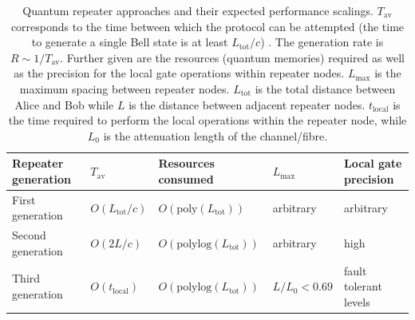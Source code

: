 \documentclass[twocolumn, aps, rmp, amsmath, amssymb, nofootinbib, superscriptaddress, longbibliography, floatfix, table-of-contents, eqsecnum]{revtex4-1}
\begin{document}
\begin{widetext}
\begin{center}
\begin{table}[!htb]
\centering
\begin{tabular}{ccccc}
\hline
\multicolumn{1}{|l|}{\textbf{Repeater generation}} & \multicolumn{1}{l|}{\rm $T_\mathrm{av}$}   & \multicolumn{1}{l|}{\rm Resources consumed}    & \multicolumn{1}{l|}{\rm  $L_\mathrm{max}$}     & \multicolumn{1}{l|}{\rm  Local gate precision}     \\ \hline \hline
\multicolumn{1}{|l|}{First generation}    & \multicolumn{1}{l|}{$O(L_\mathrm{tot}/c)$} & \multicolumn{1}{l|}{$O(\mathrm{poly}(L_\mathrm{tot}))$} & \multicolumn{1}{l|}{\rm arbitrary}  & \multicolumn{1}{l|}{\rm arbitrary}    \\ \hline
\multicolumn{1}{|l|}{Second generation}   & \multicolumn{1}{l|}{$O(2 L/c)$}     & \multicolumn{1}{l|}{$O(\mathrm{polylog}(L_\mathrm{tot}))$} & \multicolumn{1}{l|}{\rm arbitrary}  & \multicolumn{1}{l|}{\rm high}   \\ \hline
\multicolumn{1}{|l|}{Third generation}   & \multicolumn{1}{l|}{$O(t_\mathrm{local})$}     & \multicolumn{1}{l|}{$O(\mathrm{polylog}(L_\mathrm{tot}))$} & \multicolumn{1}{l|}{$L/L_0<0.69$}   & \multicolumn{1}{l|}{\rm fault tolerant levels}   \\
\hline
\end{tabular}
\caption{Quantum repeater approaches and their expected performance scalings.  $T_\mathrm{av}$ corresponds to the time between which the protocol can be attempted (the time to generate a single Bell state is at least $L_\mathrm{tot}/c$) \cite{bib:Muralidharan2016}. The generation rate is $R\sim 1/T_\mathrm{av}$. Further given are the resources (quantum memories) required as well as the precision for the local gate operations within repeater nodes. $L_\mathrm{max}$ is the maximum spacing between repeater nodes. $L_\mathrm{tot}$ is the total distance between Alice and Bob while $L$ is the distance between adjacent repeater nodes. $t_\mathrm{local}$ is the time required to perform the local operations within the repeater node, while $L_0$ is the attenuation length of the channel/fibre.}
\label{tab:rep_nets_scale}
\end{table}
\end{center}
\end{widetext}
\end{document}
